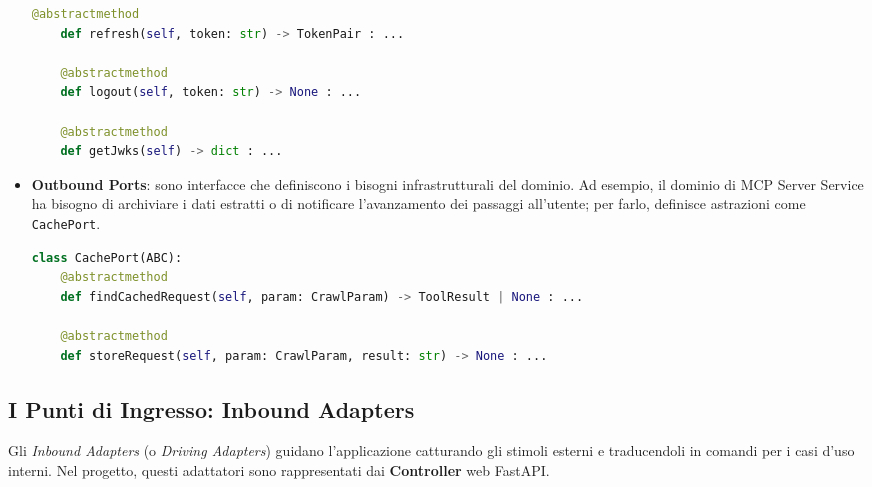 \begin{itemize}
\begin{lstlisting}[language=Python, caption={Definizione di AuthUseCase}, label={lst:auth_controller}]
    @abstractmethod
    def refresh(self, token: str) -> TokenPair : ...

    @abstractmethod
    def logout(self, token: str) -> None : ...

    @abstractmethod
    def getJwks(self) -> dict : ...
    \end{lstlisting}
    \item \textbf{Outbound Ports}: sono interfacce che definiscono i bisogni infrastrutturali del dominio. 
    Ad esempio, il dominio di MCP Server Service ha bisogno di archiviare i dati estratti o di 
    notificare l'avanzamento dei passaggi all'utente; per farlo, definisce astrazioni come 
    \texttt{CachePort}.
    \begin{lstlisting}[language=Python, caption={Definizione di CachePort}, label={lst:auth_controller}]
class CachePort(ABC):
    @abstractmethod
    def findCachedRequest(self, param: CrawlParam) -> ToolResult | None : ...

    @abstractmethod
    def storeRequest(self, param: CrawlParam, result: str) -> None : ...
    \end{lstlisting}
\end{itemize}

\subsection{I Punti di Ingresso: Inbound Adapters}
Gli \textit{Inbound Adapters} (o \textit{Driving Adapters}) guidano l'applicazione catturando gli 
stimoli esterni e traducendoli in comandi per i casi d'uso interni. 
Nel progetto, questi adattatori sono rappresentati dai \textbf{Controller} web FastAPI. 

